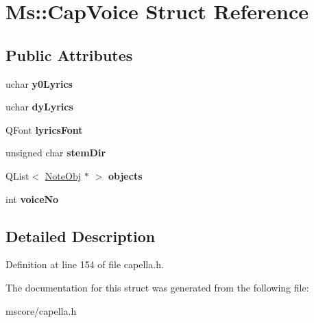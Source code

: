 \hypertarget{struct_ms_1_1_cap_voice}{}\section{Ms\+:\+:Cap\+Voice Struct Reference}
\label{struct_ms_1_1_cap_voice}
\subsection*{Public Attributes}
\begin{DoxyCompactItemize}
\item 
\mbox{\label{struct_ms_1_1_cap_voice_a97c96db636c1552e8de1edb81d8f4f3d}} 
uchar {\bfseries y0\+Lyrics}
\item 
\mbox{\label{struct_ms_1_1_cap_voice_ab22a2acfdedbb234dd7d6a1aebde5da2}} 
uchar {\bfseries dy\+Lyrics}
\item 
\mbox{\label{struct_ms_1_1_cap_voice_a070096bae66497499dc70c6ae0bb5184}} 
Q\+Font {\bfseries lyrics\+Font}
\item 
\mbox{\label{struct_ms_1_1_cap_voice_a71da7c6b61c0acb972ed590e1d2cbfbd}} 
unsigned char {\bfseries stem\+Dir}
\item 
\mbox{\label{struct_ms_1_1_cap_voice_aa1bec21bd49ade13fdce06349a5a4483}} 
Q\+List$<$ \hyperlink{class_ms_1_1_note_obj}{Note\+Obj} $\ast$ $>$ {\bfseries objects}
\item 
\mbox{\label{struct_ms_1_1_cap_voice_a822ab5fb3771ac2f1e07d4a47326291a}} 
int {\bfseries voice\+No}
\end{DoxyCompactItemize}


\subsection{Detailed Description}


Definition at line 154 of file capella.\+h.



The documentation for this struct was generated from the following file\+:\begin{DoxyCompactItemize}
\item 
mscore/capella.\+h\end{DoxyCompactItemize}
